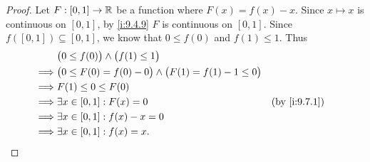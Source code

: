 \begin{proof}
  Let \(F : [0, 1] \to \mathbb{R}\) be a function where \(F(x) = f(x) - x\).
  Since \(x \mapsto x\) is continuous on \([0, 1]\), by \cref{i:9.4.9} \(F\) is continuous on \([0, 1]\).
  Since \(f([0, 1]) \subseteq [0, 1]\), we know that \(0 \leq f(0)\) and \(f(1) \leq 1\).
  Thus
  \begin{align*}
             & \big(0 \leq f(0)\big) \land \big(f(1) \leq 1\big)                                         \\
    \implies & \big(0 \leq F(0) = f(0) - 0\big) \land \big(F(1) = f(1) - 1 \leq 0\big)                   \\
    \implies & F(1) \leq 0 \leq F(0)                                                                     \\
    \implies & \exists x \in [0, 1] : F(x) = 0                                         &  & \by{i:9.7.1} \\
    \implies & \exists x \in [0, 1] : f(x) - x = 0                                                       \\
    \implies & \exists x \in [0, 1] : f(x) = x.
  \end{align*}
\end{proof}
